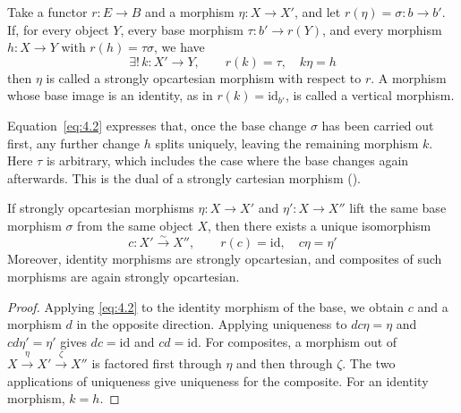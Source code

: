 \begin{definition}\label{def:4.1}

Take a functor $r:E\to B$ and a morphism $\eta:X\to X'$, and let
$r(\eta)=\sigma:b\to b'$.
If, for every object $Y$, every base morphism $\tau:b'\to r(Y)$, and every morphism
$h:X\to Y$ with $r(h)=\tau\sigma$, we have
\begin{equation*}
\exists!\,k:X'\longrightarrow Y,\qquad
r(k)=\tau,\quad k\eta=h
\tag{4.2}\label{eq:4.2}
\end{equation*}
then $\eta$ is called a strongly opcartesian morphism with respect to $r$.
A morphism whose base image is an identity, as in $r(k)=\mathrm{id}_{b'}$, is called a
vertical morphism.

Equation~\eqref{eq:4.2} expresses that, once the base change $\sigma$ has been carried out
first, any further change $h$ splits uniquely, leaving the remaining morphism $k$. Here $\tau$
is arbitrary, which includes the case where the base changes again afterwards. This is the
dual of a strongly cartesian morphism
(\cite[\href{https://stacks.math.columbia.edu/tag/02XJ}{Tag 02XJ, Definition 4.33.1}]{Stacks}).

\end{definition}

\begin{lemma}\label{lem:4.2}

If strongly opcartesian morphisms $\eta:X\to X'$ and $\eta':X\to X''$ lift the same base
morphism $\sigma$ from the same object $X$, then there exists a unique isomorphism
\begin{equation*}
c:X'\xrightarrow{\sim}X'',\qquad
r(c)=\mathrm{id},\quad c\eta=\eta'
\tag{4.3}\label{eq:4.3}
\end{equation*}
Moreover, identity morphisms are strongly opcartesian, and composites of such morphisms are
again strongly opcartesian.

\end{lemma}

\begin{proof}

Applying \eqref{eq:4.2} to the identity morphism of the base, we obtain $c$ and a morphism
$d$ in the opposite direction. Applying uniqueness to $dc\eta=\eta$ and $cd\eta'=\eta'$
gives $dc=\mathrm{id}$ and $cd=\mathrm{id}$.
For composites, a morphism out of $X\xrightarrow{\eta}X'\xrightarrow{\zeta}X''$ is factored
first through $\eta$ and then through $\zeta$. The two applications of uniqueness give
uniqueness for the composite. For an identity morphism, $k=h$.

\end{proof}

